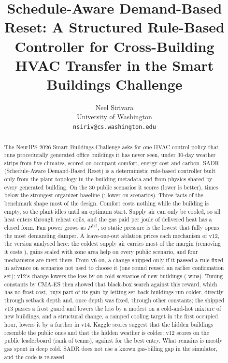 \documentclass{article}
\title{Schedule-Aware Demand-Based Reset: A Structured Rule-Based Controller for Cross-Building HVAC Transfer in the Smart Buildings Challenge}
\author{%
  Neel Sirivara\\
  University of Washington\\
  \texttt{nsiriv@cs.washington.edu}
}
\begin{document}
\maketitle

\begin{abstract}
The NeurIPS 2026 Smart Buildings Challenge asks for one HVAC control policy that runs procedurally generated office buildings it has never seen, under 30-day weather strips from five climates, scored on occupant comfort, energy cost and carbon. SADR (Schedule-Aware Demand-Based Reset) is a deterministic rule-based controller built only from the plant topology in the building metadata and from physics shared by every generated building. On the 30 public scenarios it scores \RTenConfPubCand{} (lower is better), \RElvPwTimes{} times below the strongest organizer baseline (\MetricPidWater; lower on \RElvPwWins{} scenarios). Three facts of the benchmark shape most of the design. Comfort costs nothing while the building is empty, so the plant idles until an optimum start. Supply air can only be cooled, so all heat enters through reheat coils, and the gas paid per joule of delivered heat has a closed form. Fan power grows as $P^{3/2}$, so static pressure is the lowest that fully opens the most demanding damper. A leave-one-out ablation prices each mechanism of v12, the version analysed here: the coldest supply air carries most of the margin (removing it costs \RElvAbSatRel), gains scaled with zone area help on every public scenario, and four mechanisms are inert there. From v6 on, a change shipped only if it passed a rule fixed in advance on scenarios not used to choose it (one round reused an earlier confirmation set); v12's change lowers the loss by \RTenConfHarshCThreeRelAbs{} on \RTenConfHarshCThreeN{} cold scenarios of \RTenNNewBuild{} new buildings (\RTenConfHarshCThreeWins{} wins). Tuning \RTwNParams{} constants by CMA-ES then showed that black-box search against this reward, which has no frost cost, buys part of its gain by letting set-back buildings run colder, directly through setback depth and, once depth was fixed, through other constants; the shipped v13 passes a frost guard and lowers the loss by a modest \RTwVarMixAbs{} on a cold-and-hot mixture of new buildings, and a structural change, a ramped cooling target in the first occupied hour, lowers it by a further \RFtMixAbs{} in v14. Kaggle scores suggest that the hidden buildings resemble the public ones and that the hidden weather is colder; v12 scores \RTenKagVTwelve{} on the public leaderboard (rank \RElvKagRank{} of \RElvKagTeams{} teams), against \RElvKagBest{} for the best entry. What remains is mostly gas spent in deep cold. SADR does not use a known gas-billing gap in the simulator, and the code is released.
\end{abstract}
\end{document}
